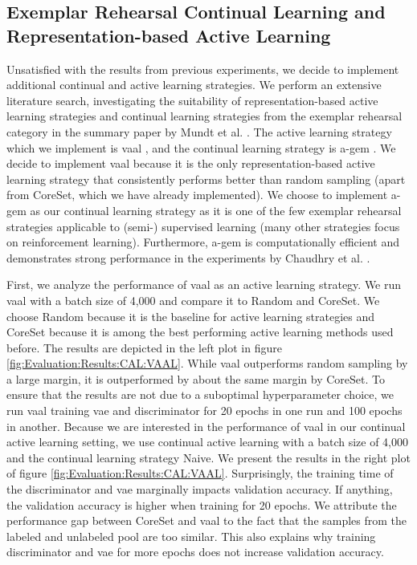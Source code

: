 \subsection{Exemplar Rehearsal Continual Learning and Representation-based Active Learning}
\label{sec:Evaluation:CAL:VAAL_AGEM}
Unsatisfied with the results from previous experiments, we decide to implement additional continual and active learning strategies. We perform an extensive literature search,
investigating the suitability of representation-based active learning strategies and continual learning strategies from the exemplar rehearsal category in the summary paper
by Mundt et al. \cite{mundt2020wholistic}. The active learning strategy which we implement is \gls{vaal} \cite{sinha2019variational}, and the continual learning strategy is
\gls{a-gem} \cite{chaudhry2018efficient}. We decide to implement \gls{vaal} because it is the only representation-based active learning strategy that consistently performs
better than random sampling (apart from CoreSet, which we have already implemented). We choose to implement \gls{a-gem} as our continual learning strategy as it
is one of the few exemplar rehearsal strategies applicable to (semi-) supervised learning (many other strategies focus on reinforcement learning). Furthermore, \gls{a-gem}
is computationally efficient and demonstrates strong performance in the experiments by Chaudhry et al. \cite{chaudhry2018efficient}. \par
First, we analyze the performance of \gls{vaal} as an active learning strategy. We run \gls{vaal} with a batch size of 4,000 and compare it to Random and CoreSet. We choose
Random because it is the baseline for active learning strategies and CoreSet because it is among the best performing active learning methods used before. The results are depicted in the left plot in figure \ref{fig:Evaluation:Results:CAL:VAAL}. While \gls{vaal} outperforms random sampling by a large margin, it is outperformed by about the
same margin by CoreSet. To ensure that the results are not due to a suboptimal hyperparameter choice, we run \gls{vaal} training \gls{vae} and discriminator for 20 epochs in
one run and 100 epochs in another. Because we are interested in the performance of \gls{vaal} in our continual active learning setting, we use continual active learning with
a batch size of 4,000 and the continual learning strategy Naive. We present the results in the right plot of figure \ref{fig:Evaluation:Results:CAL:VAAL}.
Surprisingly, the training time of the discriminator and \gls{vae} marginally impacts validation accuracy. If anything, the validation accuracy is higher when training for
20 epochs. We attribute the performance gap between CoreSet and \gls{vaal} to the fact that the samples from the labeled and unlabeled pool are too similar. This also
explains why training discriminator and \gls{vae} for more epochs does not increase validation accuracy. \par

